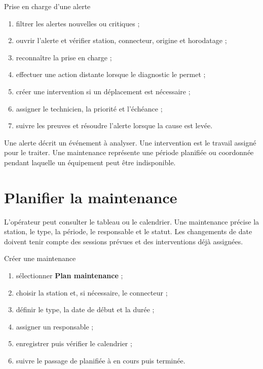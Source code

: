 \begin{procedurebox}{Prise en charge d'une alerte}
  \begin{enumerate}[leftmargin=1.6em]
    \item filtrer les alertes nouvelles ou critiques ;
    \item ouvrir l'alerte et vérifier station, connecteur, origine et horodatage ;
    \item reconnaître la prise en charge ;
    \item effectuer une action distante lorsque le diagnostic le permet ;
    \item créer une intervention si un déplacement est nécessaire ;
    \item assigner le technicien, la priorité et l'échéance ;
    \item suivre les preuves et résoudre l'alerte lorsque la cause est levée.
  \end{enumerate}
\end{procedurebox}

Une alerte décrit un événement à analyser. Une intervention est le travail
assigné pour le traiter. Une maintenance représente une période planifiée ou
coordonnée pendant laquelle un équipement peut être indisponible.

\section{Planifier la maintenance}


L'opérateur peut consulter le tableau ou le calendrier. Une maintenance précise
la station, le type, la période, le responsable et le statut. Les changements de
date doivent tenir compte des sessions prévues et des interventions déjà
assignées.

\begin{procedurebox}{Créer une maintenance}
  \begin{enumerate}[leftmargin=1.6em]
    \item sélectionner \textbf{Plan maintenance} ;
    \item choisir la station et, si nécessaire, le connecteur ;
    \item définir le type, la date de début et la durée ;
    \item assigner un responsable ;
    \item enregistrer puis vérifier le calendrier ;
    \item suivre le passage de planifiée à en cours puis terminée.
  \end{enumerate}
\end{procedurebox}

